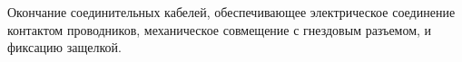 Окончание соединительных кабелей, обеспечивающее 
электрическое соединение контактом проводников, 
механическое совмещение с гнездовым разъемом, и
фиксацию защелкой.